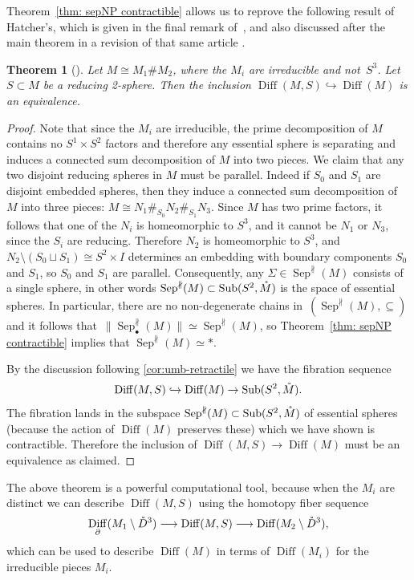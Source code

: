 \documentclass{amsart}
\theoremstyle{plain}
\newtheorem{thm}{Theorem}[section]
\theoremstyle{definition}
\DeclareMathOperator\Diff{Diff}
\DeclareMathOperator{\umb}{Sub} %
\newcommand{\interior}[1]{\smash{\mathring{#1}}}
\DeclareMathOperator\sep{Sep} %
\newcommand{\sepNP}{\sep^{\nparallel}} %
\begin{document}
Theorem~\ref{thm: sepNP contractible} allows us to reprove the following result of Hatcher's, which is given in the final remark of~\cite{Hatcher1981}, and also discussed after the main theorem in a revision of that same article \cite{Hatcher1981revised}.

\begin{thm}[{\cite{Hatcher1981}}]\label{thm:two-prime-pieces}
    Let $M\cong M_1 \# M_2$, where the $M_i$ are irreducible and not~$S^3$. Let~$S\subset M$ be a reducing 2-sphere. Then the inclusion $\Diff(M,S)\hookrightarrow \Diff(M)$ is an equivalence.
\end{thm}
    \begin{proof}
        Note that since the $M_i$ are irreducible, the prime decomposition of $M$ contains no $S^1 \times S^2$ factors and therefore any essential sphere is separating and induces a connected sum decomposition of $M$ into two pieces.
        We claim that any two disjoint reducing spheres in $M$ must be parallel.
        Indeed if $S_0$ and $S_1$ are disjoint embedded spheres, then they induce a connected sum decomposition of $M$ into three pieces: $M\cong N_1 \#_{S_0} N_2 \#_{S_1} N_3$.
        Since $M$ has two prime factors, it follows that one of the $N_i$ is homeomorphic to $S^3$, and it cannot be $N_1$ or $N_3$, since the $S_i$ are reducing.
        Therefore $N_2$ is homeomorphic to $S^3$, and $N_2\setminus (S_0\sqcup S_1)\cong S^2 \times I$ determines an embedding with boundary components $S_0$ and $S_1$, so $S_0$ and $S_1$ are parallel.
        Consequently, any $\Sigma \in \sepNP(M)$ consists of a single sphere, in other words $\sepNP(M) \subset \umb(S^2, \interior{M})$ is the space of essential spheres. 
        In particular, there are no non-degenerate chains in~$(\sepNP(M), \subseteq)$ and it follows that~$\|\sepNP_\bullet(M)\|\simeq \sepNP(M)$, so Theorem~\ref{thm: sepNP contractible} implies that $\sepNP(M)\simeq *$. 

        By the discussion following \cref{cor:umb-retractile} we have the fibration sequence
        \[
            \Diff(M,S)\hookrightarrow \Diff(M) \rightarrow \umb(S^2,\interior{M}).
        \]
        The fibration lands in the subspace $\sepNP(M) \subset \umb(S^2, \interior{M})$ of essential spheres (because the action of $\Diff(M)$ preserves these) which we have shown is contractible.
        Therefore the inclusion of $\Diff(M, S) \to \Diff(M)$ must be an equivalence as claimed.
    \end{proof}

 The above theorem is a powerful computational tool, because when the $M_i$ are distinct we can describe $\Diff(M, S)$ using the homotopy fiber sequence
       \[
            \Diff_\partial(M_1 \setminus \interior{D}^3) \longrightarrow \Diff(M, S) \longrightarrow \Diff(M_2\setminus \interior{D}^3),
       \]
which can be used to describe $\Diff(M)$ in terms of $\Diff(M_i)$ for the irreducible pieces $M_i$.
 
\end{document}
